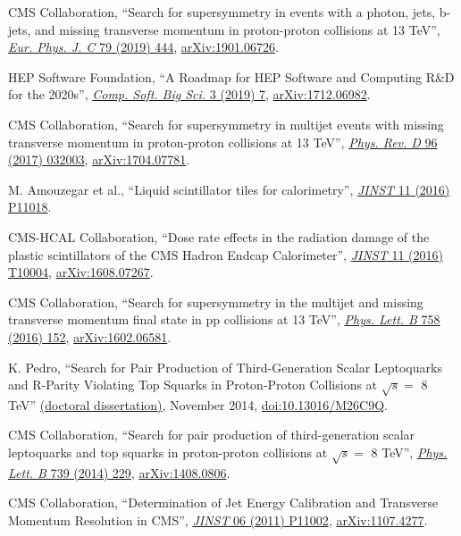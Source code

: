 \begin{description}[leftmargin=12pt,font=\normalfont,labelsep=0em]
\item CMS Collaboration, ``Search for supersymmetry in events with a photon, jets, b-jets, and missing transverse momentum in proton-proton collisions at 13 TeV'', \href{http://dx.doi.org/10.1140/epjc/s10052-019-6926-x}{\emph{Eur. Phys. J. C} 79 (2019) 444}, \href{https://arxiv.org/abs/1901.06726}{arXiv:1901.06726}.
\item HEP Software Foundation, ``A Roadmap for HEP Software and Computing R\&D for the 2020s'', \href{https://doi.org/10.1007/s41781-018-0018-8}{\emph{Comp. Soft. Big Sci.} 3 (2019) 7}, \href{https://arxiv.org/abs/1712.06982}{arXiv:1712.06982}.
\item CMS Collaboration, ``Search for supersymmetry in multijet events with missing transverse momentum in proton-proton collisions at 13 TeV'', \href{http://dx.doi.org/10.1103/PhysRevD.96.032003}{\emph{Phys. Rev. D} 96 (2017) 032003}, \href{http://arxiv.org/abs/1704.07781}{arXiv:1704.07781}.
\item M. Amouzegar et al., ``Liquid scintillator tiles for calorimetry'', \href{http://dx.doi.org/10.1088/1748-0221/11/11/P11018}{\emph{JINST} 11 (2016) P11018}.
\item CMS-HCAL Collaboration, ``Dose rate effects in the radiation damage of the plastic scintillators of the CMS Hadron Endcap Calorimeter'', \href{http://dx.doi.org/10.1088/1748-0221/11/10/T10004}{\emph{JINST} 11 (2016) T10004}, \href{http://arxiv.org/abs/1608.07267}{arXiv:1608.07267}.
\item CMS Collaboration, ``Search for supersymmetry in the multijet and missing transverse momentum final state in pp collisions at 13 TeV'', \href{http://dx.doi.org/10.1016/j.physletb.2016.05.002}{\emph{Phys. Lett. B} 758 (2016) 152}, \href{http://arxiv.org/abs/1602.06581}{arXiv:1602.06581}.
\item K. Pedro, ``Search for Pair Production of Third-Generation Scalar Leptoquarks and R-Parity Violating Top Squarks in Proton-Proton Collisions at $\sqrt{s} =$ 8 TeV'' \href{http://cds.cern.ch/record/1968611}{(doctoral dissertation)}, November 2014, \href{https://doi.org/10.13016/M26C9Q}{doi:10.13016/M26C9Q}.
\item CMS Collaboration, ``Search for pair production of third-generation scalar leptoquarks and top squarks in proton-proton collisions at $\sqrt{s} =$ 8 TeV'', \href{http://dx.doi.org/10.1016/j.physletb.2014.10.063}{\emph{Phys. Lett. B} 739 (2014) 229}, \href{http://arxiv.org/abs/1408.0806}{arXiv:1408.0806}.
\item CMS Collaboration, ``Determination of Jet Energy Calibration and Transverse Momentum Resolution in CMS'', \href{http://dx.doi.org/10.1088/1748-0221/6/11/P11002}{\emph{JINST} 06 (2011) P11002}, \href{http://arxiv.org/abs/1107.4277}{arXiv:1107.4277}.
\end{description}

